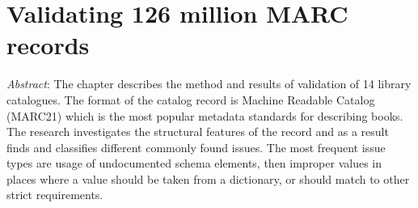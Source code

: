 \chapter{Validating 126 million MARC records}

\emph{Abstract}: The chapter describes the method and results of validation of 14 library catalogues. The format of the catalog record is Machine Readable Catalog (MARC21) which is the most popular metadata standards for describing books. The research investigates the structural features of the record and as a result finds and classifies different commonly found issues. The most frequent issue types are usage of undocumented schema elements, then improper values in places where a value should be taken from a dictionary, or should match to other strict requirements.


